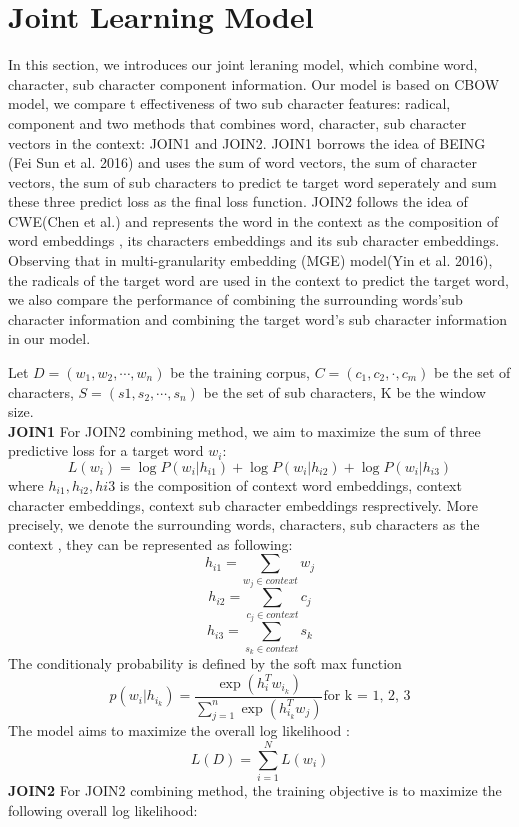 \section{Joint Learning Model}
In this section, we introduces our joint leraning model, which combine word, character, sub character component information. Our model is based on CBOW model, we compare t effectiveness of two sub character features:
radical, component and two methods that combines word, character, sub character vectors in the context: JOIN1 and JOIN2. JOIN1 borrows the idea of  BEING (Fei Sun et al. 2016) and uses the sum of word vectors, the sum of character vectors, the sum of sub characters to predict te target word seperately and sum these three predict loss as the final loss function. JOIN2 follows the idea of CWE(Chen et al.) and represents the word  in the context as the composition of word embeddings , its characters embeddings and its sub character embeddings. Observing that in multi-granularity embedding (MGE) model(Yin et al. 2016), the radicals of the target word are used in the context to predict the target word, we also compare the performance of combining the surrounding words'sub character information and combining the target word's sub character information in our model.

Let $D = (w_1, w_2, \cdots, w_n)$ be the training corpus, $C = (c_1,c_2, \cdot, c_m)$ be the set of characters, $S= (s1,s_2,\cdots, s_n)$ be the set of sub characters, K be the window size. \\
\textbf{JOIN1} \quad For JOIN2 combining method, we aim to maximize the sum of three predictive loss for a target word $w_i$:
\begin{equation*}
L(w_i) = \log P(w_i | h_{i1}) + \log P(w_i | h_{i2}) + \log P(w_i | h_{i3})
\end{equation*}
where $h_{i1}, h_{i2}, h{i3}$ is the composition of context word embeddings, context character embeddings, context sub character embeddings resprectively. More precisely, we denote the surrounding words, characters, sub characters as the context , they can be represented as following:
\begin{equation*}
h_{i1} = \sum_{w_j \in context} w_j
\end{equation*}
\begin{equation*}
h_{i2} = \sum_{c_j \in context} c_j
\end{equation*}
\begin{equation*}
h_{i3} = \sum_{s_k \in context} s_k
\end{equation*}
The conditionaly probability is defined by the soft max function
\begin{equation*}
p(w_i |h_{i_k}) = \frac{\exp(h_i^T w_{i_k})}{\sum_{j = 1}^n \exp(h_{i_k}^T w_j)} \text{for k = 1, 2, 3}
\end{equation*}
The model aims to maximize the overall log likelihood :
\begin{equation*}
L(D) = \sum_{i = 1}^N L(w_i)
\end{equation*}
\textbf{JOIN2} \quad For JOIN2 combining method, the training objective is to maximize the following overall log likelihood:

